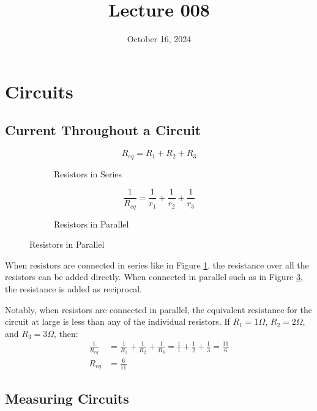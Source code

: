 \documentclass[12pt]{article}
\title{Lecture 008}
\date{October 16, 2024}
\begin{document}
\newpage
\section{Circuits}
\label{sec:circuits}

\subsection{Current Throughout a Circuit}
\label{ssec:currentThroughoutACircuit2}

\begin{figure}[H]
  \centering
  \begin{subfigure}[b]{0.45\textwidth}
    \centering
    
    \begin{equation*}
      R_{eq} = R_1 + R_2 + R_3
    \end{equation*}
    \caption{Resistors in Series}
    \label{fig:030}
  \end{subfigure}
  \begin{subfigure}[b]{0.45\textwidth}
    \centering
    
    \begin{equation*}
      \frac{1}{R_{eq}} = \frac{1}{r_1} + \frac{1}{r_2} + \frac{1}{r_3}
    \end{equation*}
    \caption{Resistors in Parallel}
    \label{fig:031}
  \end{subfigure}
\end{figure}

When resistors are connected in series like in Figure \ref{fig:030}, the resistance over
all the resistors can be added directly. When connected in parallel such as in Figure
\ref{fig:031}, the resistance is added as reciprocal.

Notably, when resistors are connected in parallel, the equivalent resistance for the
circuit at large is less than any of the individual resistors. If $R_1=1 \Omega$, $R_2=2 \Omega$, 
and $R_3=3 \Omega$, then:
\begin{align*}
  \frac{1}{R_{eq}} &= \frac{1}{R_1} + \frac{1}{R_2} + \frac{1}{R_3} = \frac{1}{1} + \frac{1}{2} + \frac{1}{3} = \frac{11}{6} \\
  R_{eq}           &= \frac{6}{11}
\end{align*}

\subsection{Measuring Circuits}
\label{ssec:measuringCircuits}
\end{document}
